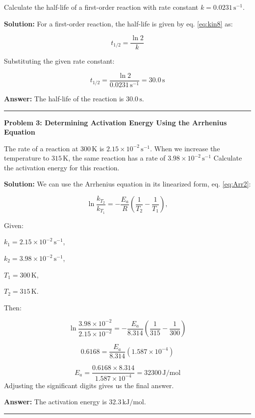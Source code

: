 \documentclass[
  9pt,
]{extbook}
\theoremstyle{definition}
\theoremstyle{definition}
\theoremstyle{definition}
\theoremstyle{definition}
\theoremstyle{remark}
\begin{document}
Calculate the half-life of a first-order reaction with rate constant \(k = 0.0231\,\text{s}^{-1}\).

\textbf{Solution:} For a first-order reaction, the half-life is given by eq. \eqref{eq:kin8} as:

\[t_{1/2} = \frac{\ln 2}{k}\]

Substituting the given rate constant:

\[t_{1/2} = \frac{\ln 2}{0.0231\,\text{s}^{-1}} = 30.0\,\text{s}\]

\textbf{Answer:} The half-life of the reaction is \(30.0\,\text{s}\).

\begin{center}\rule{0.5\linewidth}{0.5pt}\end{center}

\textbf{Problem 3: Determining Activation Energy Using the Arrhenius Equation}

The rate of a reaction at \(300\,\text{K}\) is
\(2.15 \times 10^{-2}\,\text{s}^{-1}\). When we increase the temperature to \(315\,\text{K}\), the same reaction has a rate of \(3.98 \times 10^{-2}\,\text{s}^{-1}\) Calculate the activation energy for this reaction.

\textbf{Solution:} We can use the Arrhenius equation in its linearized form, eq. \eqref{eq:Arr2}:

\[\ln \frac{k_{T_2}}{k_{T_1}}=-\frac{E_a}{R}\left(\frac{1}{T_2}-\frac{1}{T_1}\right),\]

Given:

\(k_1 = 2.15 \times 10^{-2}\,\text{s}^{-1}\),

\(k_2 = 3.98 \times 10^{-2}\,\text{s}^{-1}\),

\(T_1 = 300\,\text{K}\),

\(T_2 = 315\,\text{K}\).

Then:

\[\ln \frac{3.98 \times 10^{-2}}{2.15 \times 10^{-2}} = -\frac{E_a}{8.314}\left(\frac{1}{315} - \frac{1}{300}\right)\]

\[0.6168 = \frac{E_a}{8.314}(1.587 \times 10^{-4})\]

\[E_a = \frac{0.6168 \times 8.314}{1.587 \times 10^{-4}} = 32300\,\text{J/mol}\]
Adjusting the significant digits gives us the final answer.

\textbf{Answer:} The activation energy is \(32.3\,\text{kJ/mol}\).

\begin{center}\rule{0.5\linewidth}{0.5pt}\end{center}
\end{document}
